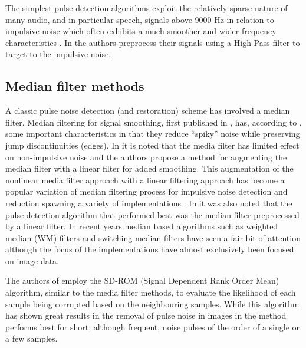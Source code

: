 The simplest pulse detection algorithms exploit the relatively sparse nature of many audio, and in particular speech, signals above 9000 Hz in relation to impulsive noise which often exhibits a much smoother and wider frequency characteristics \cite{Subramanya2007}. In \cite{Kasparis1993}\cite{US6795559} the authors preprocess their signals using a High Pass filter to target to the impulsive noise.

\subsection{Median filter methods}\label{sec:LitRevDetMedianFilts}
A classic pulse noise detection (and restoration) scheme has involved a median filter\cite{Tukey1974}\cite{Lee1985}\cite{Heinonen1985}\cite{Heinonen1987}\cite{Maekivirta1991}\cite{Kasparis1993}.
Median filtering for signal smoothing, first published in \cite{Tukey1974}, has, according to \cite{Brillinger2002}, some important characteristics in that they reduce ``spiky'' noise while preserving jump discontinuities (edges). In \cite{Lee1985} it is noted that the media filter has limited effect on non-impulsive noise and the authors propose a method for augmenting the median filter with a linear filter for added smoothing. This augmentation of the nonlinear media filter approach with a linear filtering approach has become a popular variation of median filtering process for impulsive noise detection and reduction spawning a variety of implementations \cite{Lee1985}\cite{Heinonen1985}\cite{Nieminen1987}\cite{Kasparis1993}\cite{Loveridge1995}. In \cite{Kauppinen2002} it was also noted that the pulse detection algorithm that performed best was the median filter preprocessed by a linear filter. In recent years median based algorithms such as weighted median (WM) filters \cite{Yin1996}\cite{Wang2010} and switching median filters \cite{Abreu1996}\cite{Chen2000}\cite{Chen2001}\cite{Lin2007} have seen a fair bit of attention although the focus of the implementations have almost exclusively been focused on image data.

The authors of \cite{Chandra1998} employ the SD-ROM (Signal Dependent Rank Order Mean) algorithm, similar to the media filter methods, to evaluate the likelihood of each sample being corrupted based on the neighbouring samples. While this algorithm has shown great results in the removal of pulse noise in images \cite{Abreu1996} in \cite{Chandra1998} the method performs best for short, although frequent, noise pulses of the order of a single or a few samples.

